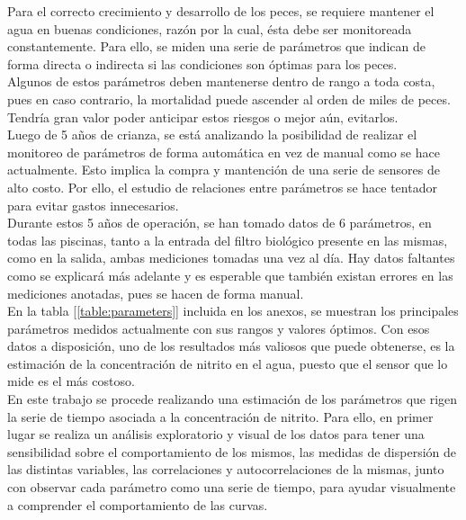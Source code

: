 \documentclass[letterpaper, 12pt]{article}
\begin{document}
Para el correcto crecimiento y desarrollo de los peces, se requiere mantener el agua en buenas condiciones, razón por la cual, ésta debe ser monitoreada constantemente. Para ello, se miden una serie de parámetros que indican de forma directa o indirecta si las condiciones son óptimas para los peces.\\

Algunos de estos parámetros deben mantenerse dentro de rango a toda costa, pues en caso contrario, la mortalidad puede ascender al orden de miles de peces. Tendría gran valor poder anticipar estos riesgos o mejor aún, evitarlos.\\

Luego de 5 años de crianza, se está analizando la posibilidad de realizar el monitoreo de parámetros de forma automática en vez de manual como se hace actualmente. Esto implica la compra y mantención de una serie de sensores de alto costo. Por ello, el estudio de relaciones entre parámetros se hace tentador para evitar gastos innecesarios.\\

Durante estos 5 años de operación, se han tomado datos de 6 parámetros, en todas las piscinas, tanto a la entrada del filtro biológico presente en las mismas, como en la salida, ambas mediciones tomadas una vez al día. Hay datos faltantes como se explicará más adelante y es esperable que también existan errores en las mediciones anotadas, pues se hacen de forma manual.\\

En la tabla [\ref{table:parameters}] incluida en los anexos, se muestran los principales parámetros medidos actualmente con sus rangos y valores óptimos. Con esos datos a disposición, uno de los resultados más valiosos que puede obtenerse, es la estimación de la concentración de nitrito en el agua, puesto que el sensor que lo mide es el más costoso.\\

En este trabajo se procede realizando una estimación de los parámetros que rigen la serie de tiempo asociada a la concentración de nitrito. Para ello, en primer lugar se realiza un análisis exploratorio y visual de los datos para tener una sensibilidad sobre el comportamiento de los mismos, las medidas de dispersión de las distintas variables, las correlaciones y autocorrelaciones de la mismas, junto con observar cada parámetro como una serie de tiempo, para ayudar visualmente a comprender el comportamiento de las curvas.\\
\end{document}
